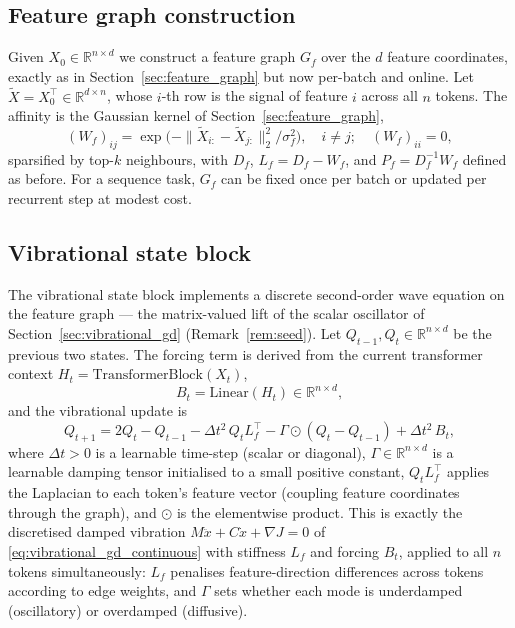 \documentclass[12pt,a4paper]{article}
\theoremstyle{plain}
\theoremstyle{definition}
\theoremstyle{remark}
\newcommand{\R}{\mathbb{R}}
\newcommand{\1}{\mathbf{1}}
\begin{document}
\subsection{Feature graph construction}

Given $X_0 \in \R^{n \times d}$ we construct a feature graph $G_f$ over
the $d$ feature coordinates, exactly as in
Section~\ref{sec:feature_graph} but now per-batch and online. Let
$\tilde{X} = X_0^\top \in \R^{d \times n}$, whose $i$-th row is the
signal of feature $i$ across all $n$ tokens. The affinity is the
Gaussian kernel of Section~\ref{sec:feature_graph},
\begin{equation}
  (W_f)_{ij} = \exp\!\bigl(-\|\tilde{X}_{i:} - \tilde{X}_{j:}\|_2^2 / \sigma_f^2\bigr),
  \quad i \neq j;
  \quad (W_f)_{ii} = 0,
  \label{eq:affinity}
\end{equation}
sparsified by top-$k$ neighbours, with $D_f$, $L_f = D_f - W_f$, and
$P_f = D_f^{-1} W_f$ defined as before. For a sequence task, $G_f$ can be
fixed once per batch or updated per recurrent step at modest cost.

\subsection{Vibrational state block}
\label{sec:vibrational_block}

The vibrational state block implements a discrete second-order wave
equation on the feature graph --- the matrix-valued lift of the scalar
oscillator of Section~\ref{sec:vibrational_gd}
(Remark~\ref{rem:seed}). Let $Q_{t-1}, Q_t \in \R^{n \times d}$ be the
previous two states. The forcing term is derived from the current
transformer context $H_t = \mathrm{TransformerBlock}(X_t)$,
\begin{equation}
  B_t = \mathrm{Linear}(H_t) \in \R^{n \times d},
  \label{eq:forcing}
\end{equation}
and the vibrational update is
\begin{equation}
  Q_{t+1} = 2Q_t - Q_{t-1}
             - \Delta t^2 \, Q_t L_f^\top
             - \Gamma \odot (Q_t - Q_{t-1})
             + \Delta t^2 \, B_t,
  \label{eq:wave_update}
\end{equation}
where $\Delta t > 0$ is a learnable time-step (scalar or diagonal),
$\Gamma \in \R^{n \times d}$ is a learnable damping tensor initialised to
a small positive constant, $Q_t L_f^\top$ applies the Laplacian to each
token's feature vector (coupling feature coordinates through the graph),
and $\odot$ is the elementwise product. This is exactly the discretised
damped vibration $M\ddot x + C \dot x + \nabla J = 0$ of
\eqref{eq:vibrational_gd_continuous} with stiffness $L_f$ and forcing
$B_t$, applied to all $n$ tokens simultaneously: $L_f$ penalises
feature-direction differences across tokens according to edge weights,
and $\Gamma$ sets whether each mode is underdamped (oscillatory) or
overdamped (diffusive).
\end{document}
